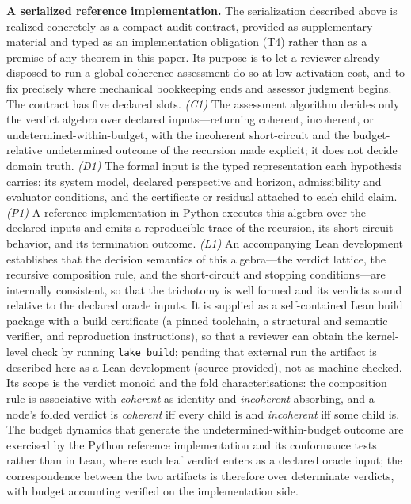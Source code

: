 \documentclass[11pt]{article}
\theoremstyle{definition}
\begin{document}
\noindent\textbf{A serialized reference implementation.} The serialization
described above is realized concretely as a compact audit contract, provided as
supplementary material and typed as an implementation obligation (T4) rather than
as a premise of any theorem in this paper. Its purpose is to let a reviewer
already disposed to run a global-coherence assessment do so at low activation
cost, and to fix precisely where mechanical bookkeeping ends and assessor
judgment begins. The contract has five declared slots.
\emph{(C1)} The assessment algorithm decides only the verdict algebra over
declared inputs---returning coherent, incoherent, or undetermined-within-budget,
with the incoherent short-circuit and the budget-relative undetermined outcome
of the recursion made explicit; it does not decide domain truth.
\emph{(D1)} The formal input is the typed representation each hypothesis carries:
its system model, declared perspective and horizon, admissibility and evaluator
conditions, and the certificate or residual attached to each child claim.
\emph{(P1)} A reference implementation in Python executes this algebra over the
declared inputs and emits a reproducible trace of the recursion, its
short-circuit behavior, and its termination outcome.
\emph{(L1)} An accompanying Lean development establishes that the decision
semantics of this algebra---the verdict lattice, the recursive composition rule,
and the short-circuit and stopping conditions---are internally consistent, so
that the trichotomy is well formed and its verdicts sound relative to the
declared oracle inputs. It is supplied as a self-contained Lean build package
with a build certificate (a pinned toolchain, a structural and semantic
verifier, and reproduction instructions), so that a reviewer can obtain the
kernel-level check by running \texttt{lake build}; pending that external run the
artifact is described here as a Lean development (source provided), not as
machine-checked. Its scope is the verdict monoid and the fold characterisations:
the composition rule is associative with \emph{coherent} as identity and
\emph{incoherent} absorbing, and a node's folded verdict is \emph{coherent} iff
every child is and \emph{incoherent} iff some child is. The budget dynamics that
generate the undetermined-within-budget outcome are exercised by the Python
reference implementation and its conformance tests rather than in Lean, where
each leaf verdict enters as a declared oracle input; the correspondence between
the two artifacts is therefore over determinate verdicts, with budget accounting
verified on the implementation side.
\end{document}
